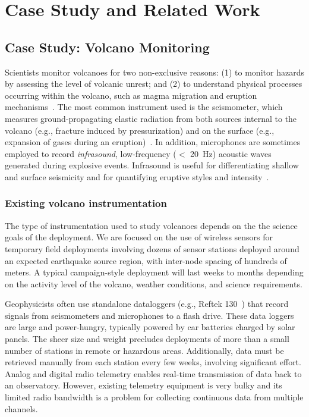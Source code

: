 \chapter{Case Study and Related Work}


\section{Case Study: Volcano Monitoring}
\label{chapter-background}


Scientists monitor volcanoes for two non-exclusive reasons: (1) to monitor
hazards by assessing the level of volcanic unrest; and (2) to understand
physical processes occurring within the volcano, such as magma migration and
eruption mechanisms~\cite{scarpa-96,mcnutt-96}.  The most common instrument
used is the seismometer, which measures ground-propagating elastic radiation
from both sources internal to the volcano (e.g., fracture induced by
pressurization) and on the surface (e.g., expansion of gases during an
eruption)~\cite{mcnutt-96}.  In addition, microphones are sometimes employed
to record {\em infrasound}, low-frequency ($<$ 20~Hz) acoustic waves
generated during explosive events.  Infrasound is useful for differentiating
shallow and surface seismicity and for quantifying eruptive styles and
intensity~\cite{johnson-etal-04b}.

\subsection{Existing volcano instrumentation}

The type of instrumentation used to study volcanoes depends on the the
science goals of the deployment. We are focused on the use of wireless
sensors for temporary field deployments involving dozens of sensor stations
deployed around an expected earthquake source region, with inter-node spacing
of hundreds of meters. A typical campaign-style deployment will last weeks to
months depending on the activity level of the volcano, weather conditions,
and science requirements.

Geophysicists often use standalone dataloggers (e.g., Reftek
130~\cite{reftek}) that record signals from seismometers and microphones to a
flash drive.  These data loggers are large and power-hungry, typically
powered by car batteries charged by solar panels.  The sheer size and weight
precludes deployments of more than a small number of stations in remote or
hazardous areas. Additionally, data must be retrieved manually from each
station every few weeks, involving significant effort. Analog and digital
radio telemetry enables real-time transmission of data back to an
observatory.  However, existing telemetry equipment is very bulky and its
limited radio bandwidth is a problem for collecting continuous data from
multiple channels.

